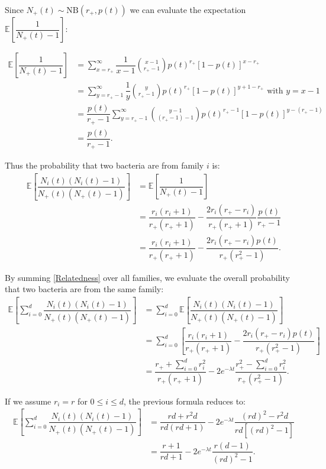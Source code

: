 \documentclass{article}
\begin{document}
Since $N_+(t) \sim \textrm{NB} (r_+, p(t))$ we can evaluate the expectation $\mathbb{E}\left[\dfrac{1}{N_+(t)-1} \right]$:

\begin{align}
\mathbb{E}\left[\dfrac{1}{N_+(t)-1} \right] &= \sum_{x=r_+}^{\infty } \dfrac{1}{x-1} \binom{x-1}{r_+-1} p(t)^{r_+} [1-p(t)]^{x-r_+} \\
 &=\sum_{y=r_+-1}^{\infty} \dfrac{1}{y} \binom{y}{r_+-1} p(t)^{r_+} [1-p(t)]^{y+1-r_+} \text{ with }y=x-1\\
 &=\dfrac{p(t)}{r_+-1}\sum_{y=r_+-1}^{\infty}\binom{y-1}{(r_+-1)-1} p(t)^{r_+-1} [1-p(t)]^{y-(r_+-1)} \\
 &=\dfrac{p(t)}{r_+-1}.
\end{align}

Thus the probability that two bacteria are from family $i$ is:
\begin{align}
\mathbb{E}\left[ \dfrac{N_i(t)(N_i(t)-1)}{N_+(t) ( N_+(t)-1 )} \right] &= \mathbb{E}\left[\dfrac{1}{N_+(t)-1} \right]\\
 &=\dfrac{r_i(r_i+1)}{r_+ (r_+ +1 )}-\dfrac{2 r_i (r_+ -r_{i})}{r_+ (r_+ +1 )}\dfrac{p(t)}{r_+-1}\\
 &=\dfrac{r_i(r_i+1)}{r_+ (r_+ +1 )}-\dfrac{2 r_i (r_+ -r_{i})p(t)}{r_+ (r_+^2 -1 )}. \label{Relatedness}
\end{align}


By summing \eqref{Relatedness} over all families, we evaluate the overall probability that two bacteria are from the same family:
\begin{align}
\mathbb{E}\left[ \displaystyle \sum_{i=0}^d \dfrac{N_i(t)(N_i(t)-1)}{N_+(t)(N_+(t)-1)} \right] &= \displaystyle \sum_{i=0}^d \mathbb{E}\left[  \dfrac{N_i(t)(N_i(t)-1)}{N_+(t)( N_+(t)-1 ) } \right]\\
&= \displaystyle \sum_{i=0}^d \left[ \dfrac{r_i(r_i+1)}{r_+ (r_+ +1 )}-\dfrac{2 r_i (r_+ -r_{i})p(t)}{r_+ (r_+^2 -1 )} \right] \\
&=    \dfrac{ r_+ + \sum_{i=0}^d r_i^2}{r_+ (r_+ +1)}  -2 e^{-\lambda t} \dfrac{ r_+^2-\sum_{i=0}^d r_i^2}{r_+ (r_+^2 -1) }.
\end{align}

If we assume $r_i=r$ for $0 \leq i \leq d$, the previous formula reduces to:
\begin{align}
\mathbb{E}\left[ \displaystyle \sum_{i=0}^d \dfrac{N_i(t)(N_i(t)-1)}{N_+(t)\left(N_+(t)-1 \right)} \right] &=
 \dfrac{ rd + r^2 d}{rd (rd +1)}  -2 e^{-\lambda t} \dfrac{ (rd)^2-r^2d}{rd [(rd)^2 -1] }\\
 &= \dfrac{r+1}{rd+1}  -2e^{-\lambda t} \dfrac{r(d-1)}{(rd)^2 -1 }.
\end{align}
\end{document}
